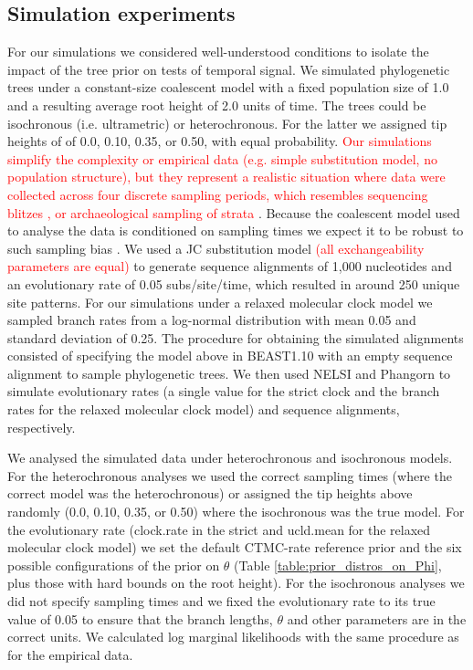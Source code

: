 \documentclass[10pt,letterpaper]{article}
\begin{document}
\subsection*{Simulation experiments}
For our simulations we considered well-understood conditions to isolate the impact of the tree prior on tests of temporal signal. We simulated phylogenetic trees under a constant-size coalescent model with a fixed population size of 1.0 and a resulting average root height of 2.0 units of time. The trees could be isochronous (i.e. ultrametric) or heterochronous. For the latter we assigned tip heights of of 0.0, 0.10, 0.35, or 0.50, with equal probability. \textcolor{red}{Our simulations simplify the complexity or empirical data (e.g. simple substitution model, no population structure), but they represent a realistic situation where data were collected across four discrete sampling periods, which resembles sequencing blitzes \cite{porter2022new}, or archaeological sampling of strata \cite{zhang2016total}}. Because the coalescent model used to analyse the data is conditioned on sampling times we expect it to be robust to such sampling bias \cite{stadler2015well, volz2014sampling, featherstone2021infectious}. We used a JC substitution model \cite{jukes1969evolution} \textcolor{red}{(all exchangeability parameters are equal)} to generate sequence alignments of 1,000 nucleotides and an evolutionary rate of 0.05 subs/site/time, which resulted in around 250 unique site patterns. For our simulations under a relaxed molecular clock model we sampled branch rates from a log-normal distribution with mean 0.05 and standard deviation of 0.25. The procedure for obtaining the simulated alignments consisted of specifying the model above in BEAST1.10 with an empty sequence alignment to sample phylogenetic trees. We then used NELSI \cite{ho2015simulating} and Phangorn \cite{schliep2011phangorn} to simulate evolutionary rates (a single value for the strict clock and the branch rates for the relaxed molecular clock model) and sequence alignments, respectively.

We analysed the simulated data under heterochronous and isochronous models. For the heterochronous analyses we used the correct sampling times (where the correct model was the heterochronous) or assigned the tip heights above randomly (0.0, 0.10, 0.35, or 0.50) where the isochronous was the true model. For the evolutionary rate (clock.rate in the strict and ucld.mean for the relaxed molecular clock model) we set the default CTMC-rate reference prior and the six possible configurations of the prior on $\theta$ (Table \ref{table:prior_distros_on_Phi}, plus those with hard bounds on the root height). For the isochronous analyses we did not specify sampling times and we fixed the evolutionary rate to its true value of 0.05 to ensure that the branch lengths, $\theta$ and other parameters are in the correct units. We calculated log marginal likelihoods with the same procedure as for the empirical data.
\end{document}
